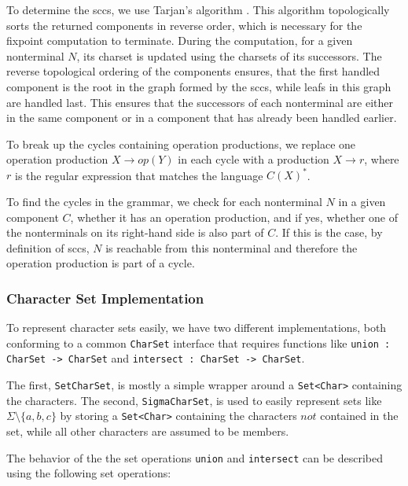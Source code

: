 To determine the \acp{scc}, we use Tarjan's algorithm \cite{tarjan}. This algorithm topologically sorts the returned components in reverse order, which is necessary for the fixpoint computation to terminate.
During the computation, for a given nonterminal $N$, its charset is updated using the charsets of its successors. The reverse topological ordering of the components ensures, that the first handled component is the root in the graph formed by the \acp{scc}, while leafs in this graph are handled last. This ensures that the successors of each nonterminal are either in the same component or in a component that has already been handled earlier.

To break up the cycles containing operation productions, we replace one operation production $X \rightarrow op(Y)$ in each cycle with a production $X \rightarrow r$, where $r$ is the regular expression that matches the language $C(X)^*$.

To find the cycles in the grammar, we check for each nonterminal $N$ in a given component $C$, whether it has an operation production, and if yes, whether one of the nonterminals on its right-hand side is also part of $C$. If this is the case, by definition of \acp{scc}, $N$ is reachable from this nonterminal and therefore the operation production is part of a cycle.

\subsubsection{Character Set Implementation}

To represent character sets easily, we have two different implementations, both conforming to a common \lstinline|CharSet| interface that requires functions like \lstinline|union : CharSet -> CharSet| and \lstinline|intersect : CharSet -> CharSet|.

The first, \lstinline|SetCharSet|, is mostly a simple wrapper around a \lstinline|Set<Char>| containing the characters.
The second, \lstinline|SigmaCharSet|, is used to easily represent sets like $\Sigma \setminus \{a, b, c\}$ by storing a \lstinline|Set<Char>| containing the characters $not$ contained in the set, while all other characters are assumed to be members.

The behavior of the the set operations \lstinline|union| and \lstinline|intersect| can be described using the following set operations:

